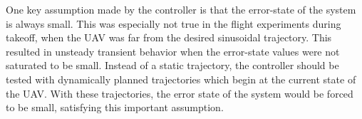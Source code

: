 One key assumption made by the controller is that the
error-state of the system is always small. This was
especially not true in the flight experiments during takeoff, when the UAV was far from the
desired sinusoidal trajectory.
This resulted in unsteady transient behavior when the error-state values were
not saturated to be small.
Instead of a static trajectory,
the controller should be tested with
dynamically planned trajectories which begin at the current state of the
UAV. With these trajectories, the error state of the system would be forced to
be small, satisfying this important assumption.


